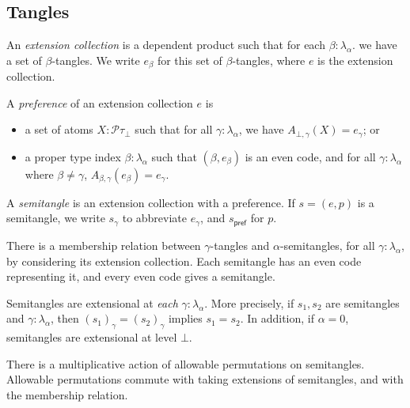 \documentclass{article}
\begin{document}
\subsection{Tangles}

\begin{definition}
    An \emph{extension collection} is a dependent product such that for each \( \beta : \lambda_\alpha \). we have a set of \( \beta \)-tangles.
    We write \( e_\beta \) for this set of \( \beta \)-tangles, where \( e \) is the extension collection.
\end{definition}
\begin{definition}
    A \emph{preference} of an extension collection \( e \) is
    \begin{itemize}
        \item a set of atoms \( X : \mathcal P \tau_\bot \) such that for all \( \gamma : \lambda_\alpha \), we have \( A_{\bot,\gamma}(X) = e_\gamma \); or
        \item a proper type index \( \beta : \lambda_\alpha \) such that \( (\beta, e_\beta) \) is an even code, and for all \( \gamma : \lambda_\alpha \) where \( \beta \neq \gamma \), \( A_{\beta,\gamma}(e_\beta) = e_\gamma \).
    \end{itemize}
\end{definition}
\begin{definition}
    A \emph{semitangle} is an extension collection with a preference.
    If \( s = (e, p) \) is a semitangle, we write \( s_\gamma \) to abbreviate \( e_\gamma \), and \( s_{\mathsf{pref}} \) for \( p \).
\end{definition}
\begin{lemma}
    There is a membership relation between \( \gamma \)-tangles and \( \alpha \)-semitangles, for all \( \gamma : \lambda_\alpha \), by considering its extension collection.
    Each semitangle has an even code representing it, and every even code gives a semitangle.
\end{lemma}
\begin{theorem}
    Semitangles are extensional at \emph{each} \( \gamma : \lambda_\alpha \).
    More precisely, if \( s_1, s_2 \) are semitangles and \( \gamma : \lambda_\alpha \), then \( (s_1)_\gamma = (s_2)_\gamma \) implies \( s_1 = s_2 \).
    In addition, if \( \alpha = 0 \), semitangles are extensional at level \( \bot \).
\end{theorem}
\begin{lemma}
    There is a multiplicative action of allowable permutations on semitangles.
    Allowable permutations commute with taking extensions of semitangles, and with the membership relation.
\end{lemma}
\end{document}

